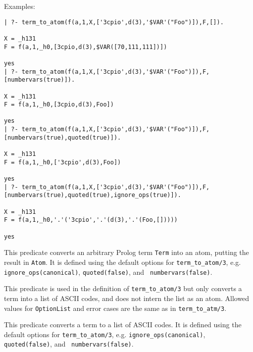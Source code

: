 \begin{description}
Examples:
{\footnotesize
\begin{verbatim}
| ?- term_to_atom(f(a,1,X,['3cpio',d(3),'$VAR'("Foo")]),F,[]).

X = _h131
F = f(a,1,_h0,[3cpio,d(3),$VAR([70,111,111])])

yes
| ?- term_to_atom(f(a,1,X,['3cpio',d(3),'$VAR'("Foo")]),F,[numbervars(true)]).

X = _h131
F = f(a,1,_h0,[3cpio,d(3),Foo])

yes
| ?- term_to_atom(f(a,1,X,['3cpio',d(3),'$VAR'("Foo")]),F,[numbervars(true),quoted(true)]).

X = _h131
F = f(a,1,_h0,['3cpio',d(3),Foo])

yes
| ?- term_to_atom(f(a,1,X,['3cpio',d(3),'$VAR'("Foo")]),F,[numbervars(true),quoted(true),ignore_ops(true)]).

X = _h131
F = f(a,1,_h0,'.'('3cpio','.'(d(3),'.'(Foo,[]))))

yes
\end{verbatim}}

%
This predicate converts an arbitrary Prolog term {\tt Term} into an
atom, putting the result in {\tt Atom}.  It is defined using the
default options for {\tt term\_to\_atom/3}, e.g. {\tt
ignore\_ops(canonical)}, {\tt quoted(false)}, and {\tt
numbervars(false)}.

%
This predicate is used in the definition of {\tt term\_to\_atom/3} but
only converts a term into a list of ASCII codes, and does not intern
the list as an atom.  Allowed values for {\tt OptionList} and error
cases are the same as in {\tt term\_to\_atm/3}.

%
This predicate converts a term to a list of ASCII codes.  It is
defined using the default options for {\tt term\_to\_atom/3},
e.g. {\tt ignore\_ops(canonical)}, {\tt quoted(false)}, and {\tt
numbervars(false)}.


\end{description}
